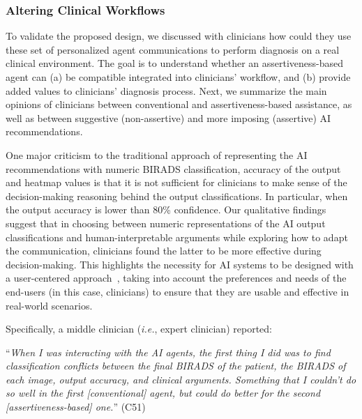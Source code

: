 \subsubsection{Altering Clinical Workflows}
\label{sec:app005007003001}

To validate the proposed design, we discussed with clinicians how could they use these set of personalized agent communications to perform diagnosis on a real clinical environment.
The goal is to understand whether an assertiveness-based agent can (a) be compatible integrated into clinicians' workflow, and (b) provide added values to clinicians' diagnosis process.
Next, we summarize the main opinions of clinicians between conventional and assertiveness-based assistance, as well as between suggestive (non-assertive) and more imposing (assertive) AI recommendations.

One major criticism to the traditional approach of representing the AI recommendations with numeric BIRADS classification, accuracy of the output and heatmap values is that it is not sufficient for clinicians to make sense of the decision-making reasoning behind the output classifications.
In particular, when the output accuracy is lower than 80\% confidence.
Our qualitative findings suggest that in choosing between numeric representations of the AI output classifications and human-interpretable arguments while exploring how to adapt the communication, clinicians found the latter to be more effective during decision-making.
This highlights the necessity for AI systems to be designed with a user-centered approach~\cite{10.1145/3491102.3517789}, taking into account the preferences and needs of the end-users (in this case, clinicians) to ensure that they are usable and effective in real-world scenarios.

\vspace{2.5mm}

\noindent
Specifically, a middle clinician ({\it i.e.}, expert clinician) reported:

\vspace{2.5mm}

\noindent
``{\it When I was interacting with the AI agents, the first thing I did was to find classification conflicts between the final BIRADS of the patient, the BIRADS of each image, output accuracy, and clinical arguments. Something that I couldn't do so well in the first [conventional] agent, but could do better for the second [assertiveness-based] one.}'' (C51)

\vspace{2.5mm}

